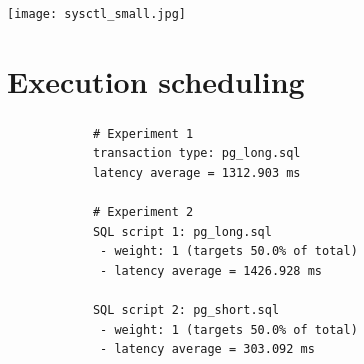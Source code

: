 \documentclass[usenames,dvipsnames, 18pt, compress, aspectratio=169]{beamer}
\begin{document}
\begin{frame}
    \frametitle{}
    \begin{center}

        \texttt{[image: sysctl\_small.jpg]}

    \end{center}
\end{frame}

\fontsize{13pt}{14}\selectfont
\section{Execution scheduling}
\fontsize{17pt}{18}\selectfont

\begin{frame}[fragile]{}
    \frametitle{}
    \begin{center}

        \begin{verbatim}
            # Experiment 1
            transaction type: pg_long.sql
            latency average = 1312.903 ms

            # Experiment 2
            SQL script 1: pg_long.sql
             - weight: 1 (targets 50.0% of total)
             - latency average = 1426.928 ms

            SQL script 2: pg_short.sql
             - weight: 1 (targets 50.0% of total)
             - latency average = 303.092 ms
        \end{verbatim}

    \end{center}
\end{frame}
\end{document}

